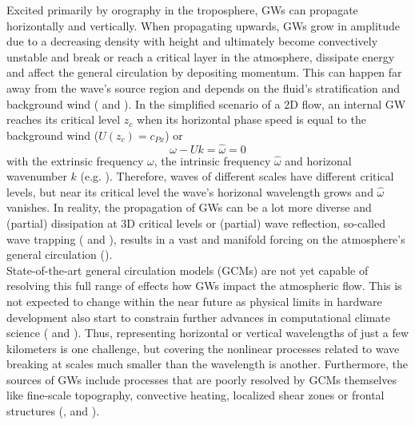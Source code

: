 Excited primarily by orography in the troposphere, GWs can propagate horizontally and vertically. When propagating upwards, GWs grow in amplitude due to a decreasing density with height and ultimately become convectively unstable and break or reach a critical layer in the atmosphere, dissipate energy and affect the general circulation by depositing momentum. This can happen far away from the wave's source region and depends on the fluid's stratification and background wind (\cite{teixeira_physics_2014} and \cite{eliassen_transfer_1960}). In the simplified scenario of a 2D flow, an internal GW reaches its critical level $z_c$ when its horizontal phase speed is equal to the background wind ($U(z_c)=c_{Px}$) or 
\begin{equation}
    \omega - U k = \hat{\omega} = 0
\end{equation}
with the extrinsic frequency $\omega$, the intrinsic frequency $\hat{\omega}$ and horizonal wavenumber $k$ (e.g. \cite[]{lin_mesoscale_2007}). Therefore, waves of different scales have different critical levels, but near its critical level the wave's horizonal wavelength grows and $\hat{\omega}$ vanishes. In reality, the propagation of GWs can be a lot more diverse and (partial) dissipation at 3D critical levels or (partial) wave reflection, so-called wave trapping (\cite{fritts_gravity_2018} and \cite{scorer_theory_1949}), results in a vast and manifold forcing on the atmosphere's general circulation (\cite{alexander_recent_2010}). \\
State-of-the-art general circulation models (GCMs) are not yet capable of resolving this full range of effects how GWs impact the atmospheric flow. This is not expected to change within the near future as physical limits in hardware development also start to constrain further advances in computational climate science (\cite{balaji_climbing_2021} and \cite{balaji_climate_2015}). Thus, representing horizontal or vertical wavelengths of just a few kilometers is one challenge, but covering the nonlinear processes related to wave breaking at scales much smaller than the wavelength is another. Furthermore, the sources of GWs include processes that are poorly resolved by GCMs themselves like fine-scale topography, convective heating, localized shear zones or frontal structures (\cite{medvedev_gravity_2019}, \cite{fritts_gravity_2003} and \cite{plougonven_internal_2014}). \\
